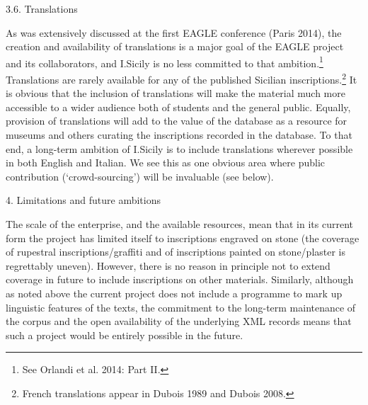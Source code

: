 \documentclass[amsthm,ebook]{saparticle}
\begin{document}
\bigskip

3.6. Translations

As was extensively discussed at the first EAGLE conference (Paris 2014), the creation and availability of translations
is a major goal of the EAGLE project and its collaborators, and I.Sicily is no less committed to that
ambition.\footnote{ See Orlandi et al. 2014: Part II.} Translations are rarely available for any of the published
Sicilian inscriptions.\footnote{ French translations appear in Dubois 1989 and Dubois 2008.} It is obvious that the
inclusion of translations will make the material much more accessible to a wider audience both of students and the
general public. Equally, provision of translations will add to the value of the database as a resource for museums and
others curating the inscriptions recorded in the database. To that end, a long-term ambition of I.Sicily is to include
translations wherever possible in both English and Italian. We see this as one obvious area where public contribution
(‘crowd-sourcing’) will be invaluable (see below).

4. Limitations and future ambitions

The scale of the enterprise, and the available resources, mean that in its current form the project has limited itself
to inscriptions engraved on stone (the coverage of rupestral inscriptions/graffiti and of inscriptions painted on
stone/plaster is regrettably uneven). However, there is no reason in principle not to extend coverage in future to
include inscriptions on other materials. Similarly, although as noted above the current project does not include a
programme to mark up linguistic features of the texts, the commitment to the long-term maintenance of the corpus and
the open availability of the underlying XML records means that such a project would be entirely possible in the future.
\end{document}
